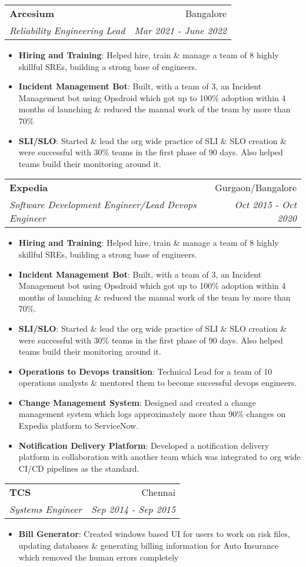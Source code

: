 \documentclass[letterpaper,11pt]{article}
\makeatletter
\newcommand{\resumeItem}[2]{
  \item\small{
    \textbf{#1}{: #2 \vspace{-2pt}}
  }
}
\newcommand{\resumeSubheading}[4]{
  \vspace{-1pt}\item
    \begin{tabular*}{0.97\textwidth}{l@{\extracolsep{\fill}}r}
      \textbf{#1} & #2 \\
      \textit{\small#3} & \textit{\small #4} \\
    \end{tabular*}\vspace{-5pt}
}
\newcommand{\resumeItemListStart}{\begin{itemize}}
\newcommand{\resumeItemListEnd}{\end{itemize}\vspace{-5pt}}
\makeatother
\begin{document}
    \resumeSubheading
      {Arcesium}{Bangalore}
      {Reliability Engineering Lead}{Mar 2021 - June 2022}
      \resumeItemListStart
        \resumeItem{Hiring and Training}
          {Helped hire, train \& manage a team of 8 highly skillful SREs, building a strong base of engineers.}
        \resumeItem{Incident Management Bot}
          {Built, with a team of 3, an Incident Management bot using Opsdroid which got up to 100\% adoption within 4 months of launching \& reduced the manual work of the team by more than 70\%}
        \resumeItem{SLI/SLO}
          {Started \& lead the org wide practice of SLI \& SLO creation \& were successful with 30\% teams in the first phase of 90 days. Also helped teams build their monitoring around it.}
      \resumeItemListEnd

    \resumeSubheading
      {Expedia}{Gurgaon/Bangalore}
      {Software Development Engineer/Lead Devops Engineer}{Oct 2015 - Oct 2020}
      \resumeItemListStart
        \resumeItem{Hiring and Training}
          {Helped hire, train \& manage a team of 8 highly skillful SREs, building a strong base of engineers.}
        \resumeItem{Incident Management Bot}
          {Built, with a team of 3, an Incident Management bot using Opsdroid which got up to 100\% adoption within 4 months of launching \& reduced the manual work of the team by more than 70\%.}
        \resumeItem{SLI/SLO}
          {Started \& lead the org wide practice of SLI \& SLO creation \& were successful with 30\% teams in the first phase of 90 days. Also helped teams build their monitoring around it.}
        \resumeItem{Operations to Devops transition}
          {Technical Lead for a team of 10 operations analysts \& mentored them to become successful devops engineers.}
        \resumeItem{Change Management System}
          {Designed and created a change management system which logs approximately more than 90\% changes on Expedia platform to ServiceNow.}
        \resumeItem{Notification Delivery Platform}
          {Developed a notification delivery platform in collaboration with another team which was integrated to org wide CI/CD pipelines as the standard.}
      \resumeItemListEnd

    \resumeSubheading
      {TCS}{Chennai}
      {Systems Engineer}{Sep 2014 - Sep 2015}
      \resumeItemListStart
        \resumeItem{Bill Generator}
          {Created windows based UI for users to work on risk files, updating databases \& generating billing information for Auto Insurance which removed the human errors completely}
      \resumeItemListEnd
\end{document}
